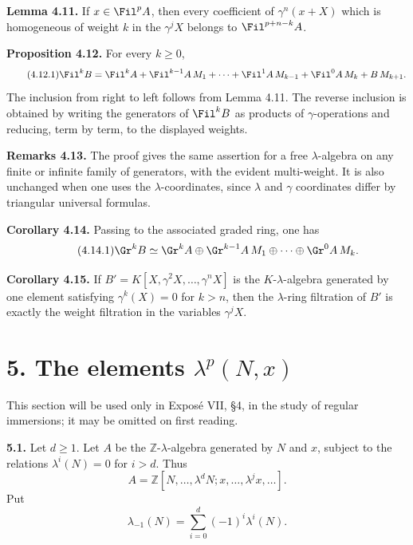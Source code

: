\textbf{Lemma 4.11.} If \(x\in\Fil^pA\), then every coefficient of \(\gamma^n(x+X)\) which is homogeneous of weight \(k\) in the \(\gamma^jX\) belongs to \(\Fil^{p+n-k}A\).

\textbf{Proposition 4.12.} For every \(k\ge0\),
\begin{equation}\tag{4.12.1}
  \Fil^kB=
  \Fil^kA+\Fil^{k-1}A\,M_1+\cdots+\Fil^1A\,M_{k-1}
  +\Fil^0A\,M_k+B\,M_{k+1}.
\end{equation}
The inclusion from right to left follows from Lemma 4.11. The reverse inclusion is obtained by writing the generators of \(\Fil^kB\) as products of \(\gamma\)-operations and reducing, term by term, to the displayed weights.

\textbf{Remarks 4.13.} The proof gives the same assertion for a free \(\lambda\)-algebra on any finite or infinite family of generators, with the evident multi-weight. It is also unchanged when one uses the \(\lambda\)-coordinates, since \(\lambda\) and \(\gamma\) coordinates differ by triangular universal formulas.

\textbf{Corollary 4.14.} Passing to the associated graded ring, one has
\begin{equation}\tag{4.14.1}
  \Gr^kB\simeq
  \Gr^kA\oplus \Gr^{k-1}A\,M_1\oplus\cdots\oplus\Gr^0A\,M_k.
\end{equation}

\textbf{Corollary 4.15.} If \(B'=K[X,\gamma^2X,\ldots,\gamma^nX]\) is the \(K\)-\(\lambda\)-algebra generated by one element satisfying \(\gamma^k(X)=0\) for \(k>n\), then the \(\lambda\)-ring filtration of \(B'\) is exactly the weight filtration in the variables \(\gamma^jX\).

\section*{5. The elements \(\lambda^p(N,x)\)}

This section will be used only in Exposé VII, §4, in the study of regular immersions; it may be omitted on first reading.

\textbf{5.1.} Let \(d\ge1\). Let \(A\) be the \(\mathbb Z\)-\(\lambda\)-algebra generated by \(N\) and \(x\), subject to the relations \(\lambda^i(N)=0\) for \(i>d\). Thus
\[
  A=\mathbb Z[N,\ldots,\lambda^dN;
       x,\ldots,\lambda^jx,\ldots].
\]
Put
\begin{equation}\tag{5.1.1}
  \lambda_{-1}(N)=\sum_{i=0}^{d}(-1)^i\lambda^i(N).
\end{equation}

